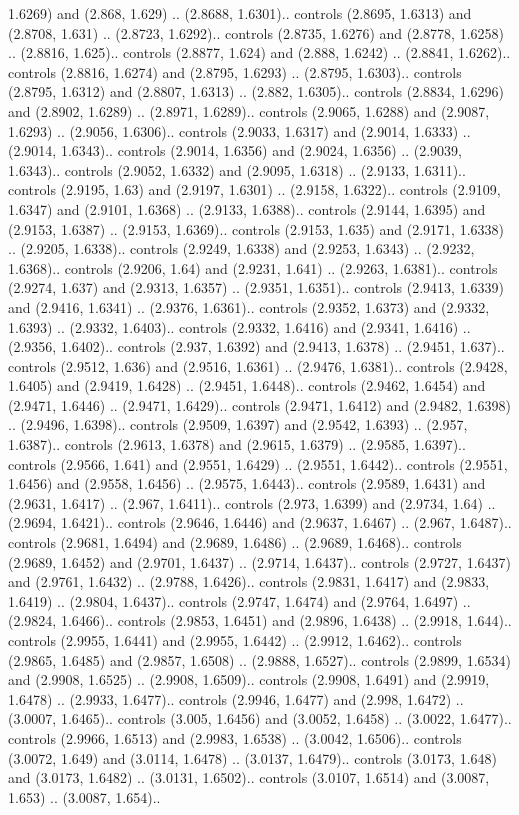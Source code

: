 1.6269) and (2.868, 1.629) .. (2.8688, 1.6301).. controls (2.8695, 1.6313) and (2.8708, 1.631) .. (2.8723, 1.6292).. controls (2.8735, 1.6276) and (2.8778, 1.6258) .. (2.8816, 1.625).. controls (2.8877, 1.624) and (2.888, 1.6242) .. (2.8841, 1.6262).. controls (2.8816, 1.6274) and (2.8795, 1.6293) .. (2.8795, 1.6303).. controls (2.8795, 1.6312) and (2.8807, 1.6313) .. (2.882, 1.6305).. controls (2.8834, 1.6296) and (2.8902, 1.6289) .. (2.8971, 1.6289).. controls (2.9065, 1.6288) and (2.9087, 1.6293) .. (2.9056, 1.6306).. controls (2.9033, 1.6317) and (2.9014, 1.6333) .. (2.9014, 1.6343).. controls (2.9014, 1.6356) and (2.9024, 1.6356) .. (2.9039, 1.6343).. controls (2.9052, 1.6332) and (2.9095, 1.6318) .. (2.9133, 1.6311).. controls (2.9195, 1.63) and (2.9197, 1.6301) .. (2.9158, 1.6322).. controls (2.9109, 1.6347) and (2.9101, 1.6368) .. (2.9133, 1.6388).. controls (2.9144, 1.6395) and (2.9153, 1.6387) .. (2.9153, 1.6369).. controls (2.9153, 1.635) and (2.9171, 1.6338) .. (2.9205, 1.6338).. controls (2.9249, 1.6338) and (2.9253, 1.6343) .. (2.9232, 1.6368).. controls (2.9206, 1.64) and (2.9231, 1.641) .. (2.9263, 1.6381).. controls (2.9274, 1.637) and (2.9313, 1.6357) .. (2.9351, 1.6351).. controls (2.9413, 1.6339) and (2.9416, 1.6341) .. (2.9376, 1.6361).. controls (2.9352, 1.6373) and (2.9332, 1.6393) .. (2.9332, 1.6403).. controls (2.9332, 1.6416) and (2.9341, 1.6416) .. (2.9356, 1.6402).. controls (2.937, 1.6392) and (2.9413, 1.6378) .. (2.9451, 1.637).. controls (2.9512, 1.636) and (2.9516, 1.6361) .. (2.9476, 1.6381).. controls (2.9428, 1.6405) and (2.9419, 1.6428) .. (2.9451, 1.6448).. controls (2.9462, 1.6454) and (2.9471, 1.6446) .. (2.9471, 1.6429).. controls (2.9471, 1.6412) and (2.9482, 1.6398) .. (2.9496, 1.6398).. controls (2.9509, 1.6397) and (2.9542, 1.6393) .. (2.957, 1.6387).. controls (2.9613, 1.6378) and (2.9615, 1.6379) .. (2.9585, 1.6397).. controls (2.9566, 1.641) and (2.9551, 1.6429) .. (2.9551, 1.6442).. controls (2.9551, 1.6456) and (2.9558, 1.6456) .. (2.9575, 1.6443).. controls (2.9589, 1.6431) and (2.9631, 1.6417) .. (2.967, 1.6411).. controls (2.973, 1.6399) and (2.9734, 1.64) .. (2.9694, 1.6421).. controls (2.9646, 1.6446) and (2.9637, 1.6467) .. (2.967, 1.6487).. controls (2.9681, 1.6494) and (2.9689, 1.6486) .. (2.9689, 1.6468).. controls (2.9689, 1.6452) and (2.9701, 1.6437) .. (2.9714, 1.6437).. controls (2.9727, 1.6437) and (2.9761, 1.6432) .. (2.9788, 1.6426).. controls (2.9831, 1.6417) and (2.9833, 1.6419) .. (2.9804, 1.6437).. controls (2.9747, 1.6474) and (2.9764, 1.6497) .. (2.9824, 1.6466).. controls (2.9853, 1.6451) and (2.9896, 1.6438) .. (2.9918, 1.644).. controls (2.9955, 1.6441) and (2.9955, 1.6442) .. (2.9912, 1.6462).. controls (2.9865, 1.6485) and (2.9857, 1.6508) .. (2.9888, 1.6527).. controls (2.9899, 1.6534) and (2.9908, 1.6525) .. (2.9908, 1.6509).. controls (2.9908, 1.6491) and (2.9919, 1.6478) .. (2.9933, 1.6477).. controls (2.9946, 1.6477) and (2.998, 1.6472) .. (3.0007, 1.6465).. controls (3.005, 1.6456) and (3.0052, 1.6458) .. (3.0022, 1.6477).. controls (2.9966, 1.6513) and (2.9983, 1.6538) .. (3.0042, 1.6506).. controls (3.0072, 1.649) and (3.0114, 1.6478) .. (3.0137, 1.6479).. controls (3.0173, 1.648) and (3.0173, 1.6482) .. (3.0131, 1.6502).. controls (3.0107, 1.6514) and (3.0087, 1.653) .. (3.0087, 1.654).. 